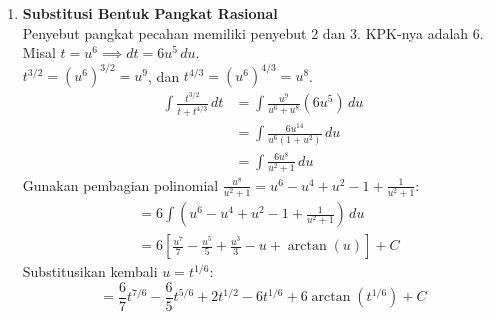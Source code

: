 \documentclass[a4paper,12pt]{article}
\begin{document}
\begin{enumerate}
  \item \textbf{Substitusi Bentuk Pangkat Rasional} \\
        Penyebut pangkat pecahan memiliki penyebut $2$ dan $3$. KPK-nya adalah $6$. \\
        Misal $t = u^6 \implies dt = 6u^5\,du$. \\
        $t^{3/2} = (u^6)^{3/2} = u^9$, dan $t^{4/3} = (u^6)^{4/3} = u^8$.
        \begin{align*}
          \int \frac{t^{3/2}}{t+t^{4/3}}\,dt &= \int \frac{u^9}{u^6+u^8} (6u^5)\,du \\
          &= \int \frac{6u^{14}}{u^6(1+u^2)}\,du \\
          &= \int \frac{6u^8}{u^2+1}\,du
        \end{align*}
        Gunakan pembagian polinomial $\frac{u^8}{u^2+1} = u^6 - u^4 + u^2 - 1 + \frac{1}{u^2+1}$:
        \begin{align*}
          &= 6 \int \left( u^6 - u^4 + u^2 - 1 + \frac{1}{u^2+1} \right)\,du \\
          &= 6 \left[ \frac{u^7}{7} - \frac{u^5}{5} + \frac{u^3}{3} - u + \arctan(u) \right] + C
        \end{align*}
        Substitusikan kembali $u = t^{1/6}$:
        \[ = \frac{6}{7}t^{7/6} - \frac{6}{5}t^{5/6} + 2t^{1/2} - 6t^{1/6} + 6\arctan(t^{1/6}) + C \]
\end{enumerate}
\end{document}
